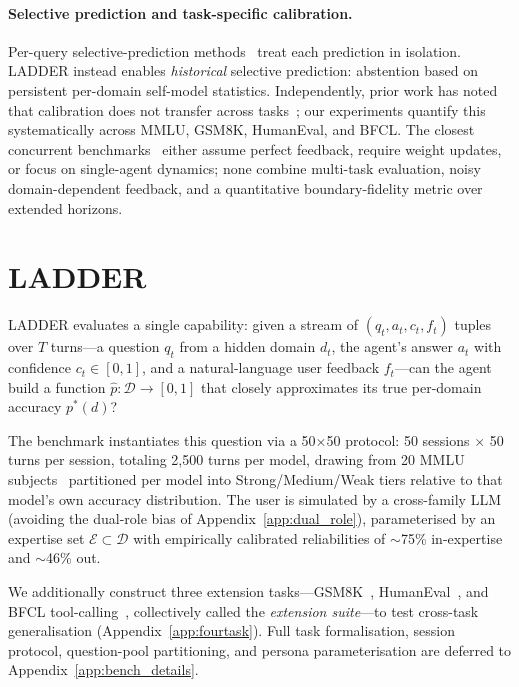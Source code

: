 \documentclass[11pt]{article}
\begin{document}
\paragraph{Selective prediction and task-specific calibration.} Per-query selective-prediction methods~\citep{kapoor2024taught, diao2024rtuning, xu2024sayself, traub2024augrc, li2025abstention, kirichenko2025abstentionbench, ahdritz2024knowable} treat each prediction in isolation. LADDER instead enables \emph{historical} selective prediction: abstention based on persistent per-domain self-model statistics. Independently, prior work has noted that calibration does not transfer across tasks~\citep{shen2024thermometer, chen2024reconfidencing, manggala2025qacal}; our experiments quantify this systematically across MMLU, GSM8K, HumanEval, and BFCL. The closest concurrent benchmarks~\citep{fang2025ccg, han2024lepe, dong2025rlplus, zhou2026sim2real, omnibehavior2025} either assume perfect feedback, require weight updates, or focus on single-agent dynamics; none combine multi-task evaluation, noisy domain-dependent feedback, and a quantitative boundary-fidelity metric over extended horizons.

\section{LADDER}
\label{sec:benchmark}

LADDER evaluates a single capability: given a stream of $(q_t, a_t, c_t, f_t)$ tuples over $T$ turns---a question $q_t$ from a hidden domain $d_t$, the agent's answer $a_t$ with confidence $c_t \in [0,1]$, and a natural-language user feedback $f_t$---can the agent build a function $\hat{p}: \mathcal{D} \to [0,1]$ that closely approximates its true per-domain accuracy $p^*(d)$?

The benchmark instantiates this question via a 50$\times$50 protocol: 50 sessions $\times$ 50 turns per session, totaling 2{,}500 turns per model, drawing from 20 MMLU subjects~\citep{hendrycks2021measuring} partitioned per model into Strong/Medium/Weak tiers relative to that model's own accuracy distribution. The user is simulated by a cross-family LLM (avoiding the dual-role bias of Appendix~\ref{app:dual_role}), parameterised by an expertise set $\mathcal{E} \subset \mathcal{D}$ with empirically calibrated reliabilities of $\sim$75\% in-expertise and $\sim$46\% out.

We additionally construct three extension tasks---GSM8K~\citep{cobbe2021gsm8k}, HumanEval~\citep{chen2021humaneval}, and BFCL tool-calling~\citep{bfcl2024}, collectively called the \emph{extension suite}---to test cross-task generalisation (Appendix~\ref{app:fourtask}). Full task formalisation, session protocol, question-pool partitioning, and persona parameterisation are deferred to Appendix~\ref{app:bench_details}.
\end{document}
